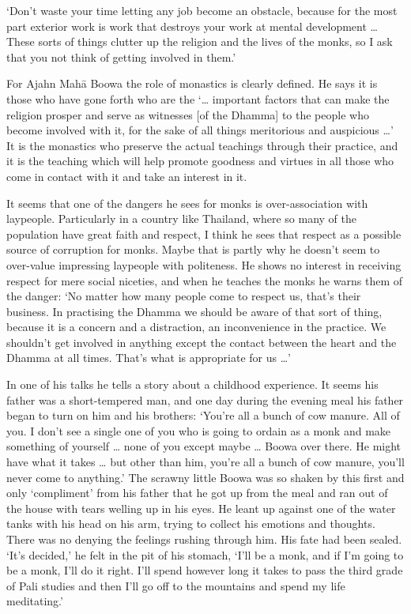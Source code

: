 `Don't waste your time letting any job become an obstacle, because for
the most part exterior work is work that destroys your work at mental
development \ldots{} These sorts of things clutter up the religion and
the lives of the monks, so I ask that you not think of getting involved
in them.'

For Ajahn Mahā Boowa the role of monastics is clearly defined. He says
it is those who have gone forth who are the `\ldots{} important factors
that can make the religion prosper and serve as witnesses {[}of the
Dhamma{]} to the people who become involved with it, for the sake of all
things meritorious and auspicious \ldots{}' It is the monastics who
preserve the actual teachings through their practice, and it is the
teaching which will help promote goodness and virtues in all those who
come in contact with it and take an interest in it.

It seems that one of the dangers he sees for monks is over-association
with laypeople. Particularly in a country like Thailand, where so many
of the population have great faith and respect, I think he sees that
respect as a possible source of corruption for monks. Maybe that is
partly why he doesn't seem to over-value impressing laypeople with
politeness. He shows no interest in receiving respect for mere social
niceties, and when he teaches the monks he warns them of the danger: `No
matter how many people come to respect us, that's their business. In
practising the Dhamma we should be aware of that sort of thing, because
it is a concern and a distraction, an inconvenience in the practice. We
shouldn't get involved in anything except the contact between the heart
and the Dhamma at all times. That's what is appropriate for us \ldots{}'

In one of his talks he tells a story about a childhood experience. It
seems his father was a short-tempered man, and one day during the
evening meal his father began to turn on him and his brothers: `You're
all a bunch of cow manure. All of you. I don't see a single one of you
who is going to ordain as a monk and make something of yourself \ldots{}
none of you except maybe \ldots{} Boowa over there. He might have what
it takes \ldots{} but other than him, you're all a bunch of cow manure,
you'll never come to anything.' The scrawny little Boowa was so shaken
by this first and only `compliment' from his father that he got up from
the meal and ran out of the house with tears welling up in his eyes. He
leant up against one of the water tanks with his head on his arm, trying
to collect his emotions and thoughts. There was no denying the feelings
rushing through him. His fate had been sealed. `It's decided,' he felt
in the pit of his stomach, `I'll be a monk, and if I'm going to be a
monk, I'll do it right. I'll spend however long it takes to pass the
third grade of Pali studies and then I'll go off to the mountains and
spend my life meditating.'

